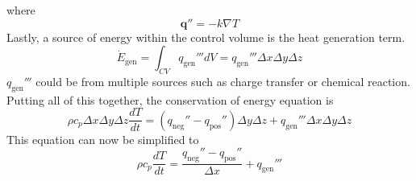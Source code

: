 \documentclass[12pt]{article}
\begin{document}
		where
		\begin{equation}
			\mathbf{q}'' = -k \nabla T
		\end{equation}
		Lastly, a source of energy within the control volume is the heat generation term.
		\begin{equation} 
			\dot{E}_\text{gen} = \int_{CV} q_\text{gen}''' dV = q_\text{gen}''' \Delta x \Delta y \Delta z
		\end{equation}
		$q_\text{gen}'''$ could be from multiple sources such as charge transfer or chemical reaction.\\
		Putting all of this together, the conservation of energy equation is 
		\begin{equation}
			\rho c_p \Delta x \Delta y \Delta z \frac{dT}{dt} = \left(q_\text{neg}'' - q_\text{pos}''  \right)\Delta y \Delta z + q_\text{gen}''' \Delta x \Delta y \Delta z
		\end{equation}
		This equation can now be simplified to 
		\begin{equation}
			\rho c_p \frac{dT}{dt} = \frac{q_\text{neg}'' - q_\text{pos}''}{\Delta x} + q_\text{gen}''' 
		\end{equation}
\end{document}
